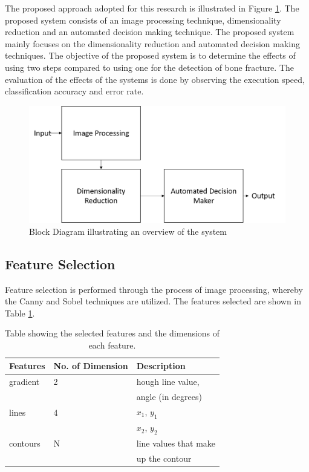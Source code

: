 \documentclass[11pt,twocolumn]{witseiepaper}
\begin{document}
	The proposed approach adopted for this research is illustrated in Figure \ref{fig:system overview}. The proposed system consists of an image processing technique, dimensionality reduction and an automated decision making technique. The proposed system mainly focuses on the dimensionality reduction and automated decision making techniques. The objective of the proposed system is to determine the effects of using two steps compared to using one for the detection of bone fracture. The evaluation of the effects of the systems is done by observing the execution speed, classification accuracy and error rate.
	
	\begin{figure}[!h]
		\centering
		\includegraphics[scale=0.23]{system_overview.png}
		\caption{Block Diagram illustrating an overview of the system }
		\label{fig:system overview}
	\end{figure}
	
	\subsection{Feature Selection}
	Feature selection is performed through the process of image processing, whereby the Canny and Sobel techniques are utilized. The features selected are shown in Table \ref{feature_selection}.
	
	\begin{table}[!h]
		\centering
		\caption{Table showing the selected features and the dimensions of each feature.}
		\label{feature_selection}
		\begin{tabular}{|l|p{2cm}|l|}
			\hline
			Features & No. of Dimension & Description \\
			\hline \hline
			gradient & 2 & hough line value, \\
			& & angle (in degrees)\\
			\hline
			lines    & 4 & $x_{1}$, $y_{1}$ \\
			& & $x_{2}$, $y_{2}$ \\
			\hline
			contours & N  & line values that make \\
			& & up the contour\\
			\hline
		\end{tabular}
	\end{table}
	
\end{document}
